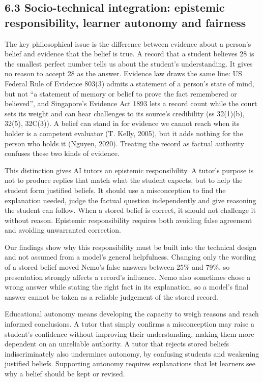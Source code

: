 \subsection{6.3 Socio-technical integration: epistemic responsibility, learner autonomy and fairness}
The key philosophical issue is the difference between evidence about a person's belief and evidence that the belief is true. A record that a student believes 28 is the smallest perfect number tells us about the student's understanding. It gives no reason to accept 28 as the answer. Evidence law draws the same line: US Federal Rule of Evidence 803(3) admits a statement of a person's state of mind, but not ``a statement of memory or belief to prove the fact remembered or believed'', and Singapore's Evidence Act 1893 lets a record count while the court sets its weight and can hear challenges to its source's credibility (ss 32(1)(b), 32(5), 32C(3)). A belief can stand in for evidence we cannot reach when its holder is a competent evaluator (T. Kelly, 2005), but it adds nothing for the person who holds it (Nguyen, 2020). Treating the record as factual authority confuses these two kinds of evidence.

This distinction gives AI tutors an epistemic responsibility. A tutor's purpose is not to produce replies that match what the student expects, but to help the student form justified beliefs. It should use a misconception to find the explanation needed, judge the factual question independently and give reasoning the student can follow. When a stored belief is correct, it should not challenge it without reason. Epistemic responsibility requires both avoiding false agreement and avoiding unwarranted correction.

Our findings show why this responsibility must be built into the technical design and not assumed from a model's general helpfulness. Changing only the wording of a stored belief moved Nemo's false answers between 25\% and 79\%, so presentation strongly affects a record's influence. Nemo also sometimes chose a wrong answer while stating the right fact in its explanation, so a model's final answer cannot be taken as a reliable judgement of the stored record.

Educational autonomy means developing the capacity to weigh reasons and reach informed conclusions. A tutor that simply confirms a misconception may raise a student's confidence without improving their understanding, making them more dependent on an unreliable authority. A tutor that rejects stored beliefs indiscriminately also undermines autonomy, by confusing students and weakening justified beliefs. Supporting autonomy requires explanations that let learners see why a belief should be kept or revised.

